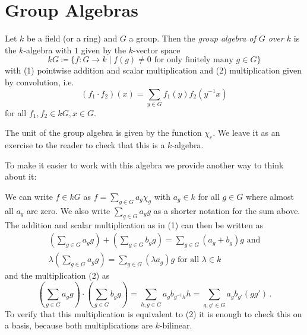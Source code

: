 \section{Group Algebras}


\begin{defi}
  Let $k$ be a field (or a ring) and $G$ a group.
  Then the \emph{group algebra of $G$ over $k$} is the $k$-algebra with $1$ given by the $k$-vector space
  \[
              kG
    \coloneqq \{
                f \colon G \to k
              \mid
                f(g) \neq 0 \text{ for only finitely many } g \in G
              \}
  \]
  with (1) pointwise addition and scalar multiplication and (2) multiplication given by convolution, i.e.\
  \[
      (f_1 \cdot f_2)(x)
    = \sum_{y \in G} f_1(y) f_2\left( y^{-1}x \right)
  \]
  for all $f_1, f_2 \in kG, x \in G$.
\end{defi}

The unit of the group algebra is given by the function $\chi_e$.
We leave it as an exercise to the reader to check that this is a $k$-algebra.

To make it easier to work with this algebra we provide another way to think about it:

We can write $f \in kG$ as $f = \sum_{g \in G} a_g \chi_g$ with $a_g \in k$ for all $g \in G$ where almost all $a_g$ are zero.
We also write $\sum_{g \in G} a_g g$ as a shorter notation for the sum above.
The addition and scalar multiplication as in (1) can then be written as
\begin{gather*}
      \left( \sum_{g \in G} a_g g \right)
    + \left( \sum_{g \in G} b_g g \right)
  = \sum_{g \in G} (a_g + b_g) g
  \text{ and}
  \\
    \lambda \left( \sum_{g \in G} a_g g \right)
  = \sum_{g \in G} (\lambda a_g) g
    \text{ for all }
    \lambda \in k
\end{gather*}
and the multiplication (2) as
\[
          \left( \sum_{g \in G} a_g g \right)
    \cdot \left( \sum_{g \in G} b_g g \right)
  = \sum_{h, g \in G} a_g b_{g^{-1}h} h
  = \sum_{g, g' \in G} a_g b_{g'} (g g') \,.
\]
To verify that this multiplication is equivalent to (2) it is enough to check this on a basis, because both multiplications are $k$-bilinear.

